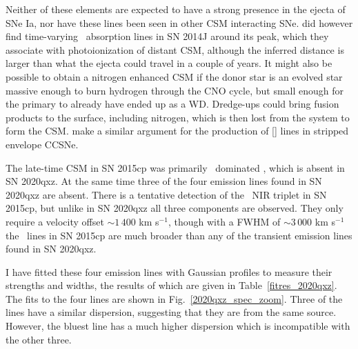 \documentclass[a4paper,oneside,12pt, class=Latex/Classes/PhDthesisPSnPDF, crop=false]{standalone}
\begin{document}
Neither of these elements are expected to have a strong presence in the ejecta of SNe Ia, nor have these lines been seen in other CSM interacting SNe. \citet{2014J_KI} did however find time-varying \KI\ absorption lines in SN 2014J around its peak, which they associate with photoionization of distant CSM, although the inferred distance is larger than what the ejecta could travel in a couple of years. It might also be possible to obtain a nitrogen enhanced CSM if the donor star is an evolved star massive enough to burn hydrogen through the CNO cycle, but small enough for the primary to already have ended up as a WD. Dredge-ups could bring fusion products to the surface, including nitrogen, which is then lost from the system to form the CSM. \citet{N_lines_SECCSN} make a similar argument for the production of [\NII] lines in stripped envelope CCSNe.

The late-time CSM in SN 2015cp was primarily \Halpha\ dominated \citep{2015cp}, which is absent in SN 2020qxz. At the same time three of the four emission lines found in SN 2020qxz are absent. There is a tentative detection of the \CaII\ NIR triplet in SN 2015cp, but unlike in SN 2020qxz all three components are observed. They only require a velocity offset $\sim1\,400$ km s$^{-1}$, though with a FWHM of $\sim3\,000$ km s$^{-1}$ the \CaII\ lines in SN 2015cp are much broader than any of the transient emission lines found in SN 2020qxz.

I have fitted these four emission lines with Gaussian profiles to measure their strengths and widths, the results of which are given in Table~\ref{fitres_2020qxz}. The fits to the four lines are shown in Fig.~\ref{2020qxz_spec_zoom}. Three of the lines have a similar dispersion, suggesting that they are from the same source. However, the bluest line has a much higher dispersion which is incompatible with the other three. 
\end{document}
